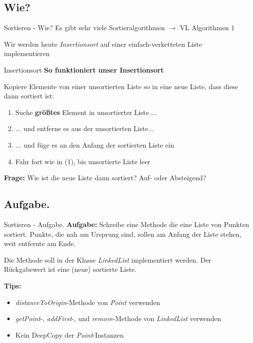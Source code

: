 \documentclass[18pt]{beamer}
\begin{document}
\subsection{Wie?}
\begin{frame}{Sortieren - Wie?}
		Es gibt sehr viele Sortieralgorithmen $\rightarrow$ VL Algorithmen 1
		
		Wir werden heute \emph{Insertionsort} auf einer einfach-verketteten Liste implementieren
\end{frame}


\begin{frame}{Insertionsort}
	\textbf{So funktioniert unser Insertionsort}
	
	Kopiere Elemente von einer unsortierten Liste so in eine neue Liste, dass diese dann sortiert ist:\pause
	\begin{enumerate}
		\item Suche \textbf{größtes} Element in unsortierter Liste ...
		\item ... und entferne es aus der unsortierten Liste...
		\item ... und füge es an den Anfang der sortierten Liste ein
		\item Fahr fort wie in (1), bis unsortierte Liste leer
	\end{enumerate}\pause
	
	\textbf{Frage:} Wie ist die neue Liste dann sortiert? Auf- oder Absteigend?
\end{frame}

\subsection{Aufgabe.}
\begin{frame}{Sortieren - Aufgabe.}
	\textbf{Aufgabe:} Schreibe eine Methode die eine Liste von Punkten sortiert. Punkte, die nah am Ursprung sind, 	sollen am Anfang der Liste stehen, weit entfernte am Ende.\pause
	
	
	Die Methode soll in der Klasse \emph{LinkedList} implementiert werden. Der Rückgabewert ist eine (neue) sortierte Liste.\pause
	
	
	\textbf{Tips:}
	\begin{itemize}
		\item \emph{distanceToOrigin}-Methode von \emph{Point} verwenden
		\item \emph{getPoint}-, \emph{addFirst}-, und \emph{remove}-Methode von \emph{LinkedList} verwenden
		\item Kein DeepCopy der \emph{Point}-Instanzen
	\end{itemize}
\end{frame}
\end{document}
